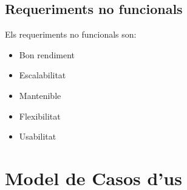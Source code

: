 \subsection{Requeriments no funcionals}
Els requeriments no funcionals son:
\begin{itemize}
\item Bon rendiment
\item Escalabilitat
\item Mantenible
\item Flexibilitat
\item Usabilitat
\end{itemize}

\section{Model de Casos d'us}

